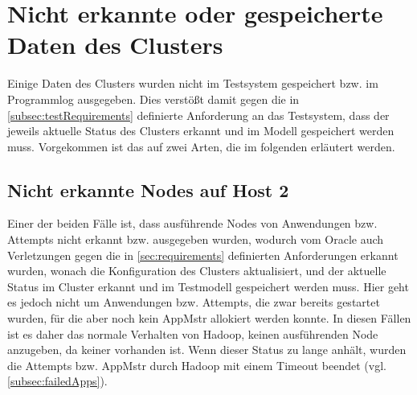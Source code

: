 \section{Nicht erkannte oder gespeicherte Daten des Clusters}
\label{sec:notDetectedData}

Einige Daten des Clusters wurden nicht im Testsystem gespeichert bzw. im Programmlog ausgegeben.
Dies verstößt damit gegen die in \cref{subsec:testRequirements} definierte Anforderung an das Testsystem, dass der jeweils aktuelle Status des Clusters erkannt und im Modell gespeichert werden muss.
Vorgekommen ist das auf zwei Arten, die im folgenden erläutert werden.

\subsection{Nicht erkannte Nodes auf Host 2}
\label{subsec:notDetectedHost2}

Einer der beiden Fälle ist, dass ausführende Nodes von Anwendungen bzw. Attempts nicht erkannt bzw. ausgegeben wurden, wodurch vom Oracle auch Verletzungen gegen die in \cref{sec:requirements} definierten Anforderungen erkannt wurden, wonach die Konfiguration des Clusters aktualisiert, und der aktuelle Status im Cluster erkannt und im Testmodell gespeichert werden muss.
Hier geht es jedoch nicht um Anwendungen bzw. Attempts, die zwar bereits gestartet wurden, für die aber noch kein \ac{AppMstr} allokiert werden konnte.
In diesen Fällen ist es daher das normale Verhalten von Hadoop, keinen ausführenden Node anzugeben, da keiner vorhanden ist.
Wenn dieser Status zu lange anhält, wurden die Attempts bzw. \ac{AppMstr} durch Hadoop mit einem Timeout beendet (vgl. \cref{subsec:failedApps}).

